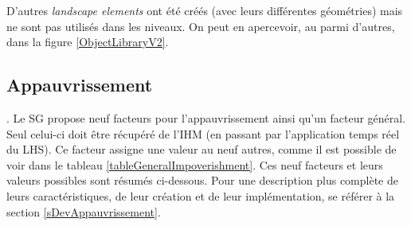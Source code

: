 		D'autres \textit{landscape elements} ont été créés (avec leurs différentes géométries) mais ne sont pas utilisés dans les niveaux. On peut en apercevoir, au parmi d'autres, dans la figure \ref{ObjectLibraryV2}.
		
	\subsection*{Appauvrissement}.
		Le SG propose neuf facteurs pour l'appauvrissement ainsi qu'un facteur général. Seul celui-ci doit être récupéré de l'IHM (en passant par l'application temps réel du LHS). Ce facteur assigne une valeur au neuf autres, comme il est possible de voir dans le tableau \ref{tableGeneralImpoverishment}. Ces neuf facteurs et leurs valeurs possibles sont résumés ci-dessous. Pour une description plus complète de leurs caractéristiques, de leur création et de leur implémentation, se référer à la section \ref{sDevAppauvrissement}.
